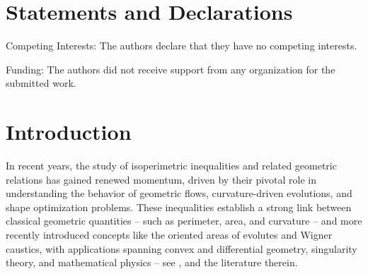 \documentclass{amsart}
\theoremstyle{definition}
\numberwithin{equation}{section}
\begin{document}
\maketitle

\section*{Statements and Declarations}
Competing Interests: The authors declare that they have no competing interests.

Funding: The authors did not receive support from any organization for the submitted work.

\section{Introduction}

\noindent In recent years, the study of isoperimetric inequalities and related geometric relations has gained renewed momentum, driven by their pivotal role in understanding the behavior of geometric flows, curvature-driven evolutions, and shape optimization problems. These inequalities establish a strong link between classical geometric quantities -- such as perimeter, area, and curvature -- and more recently introduced concepts like the oriented areas of evolutes and Wigner caustics, with applications spanning convex and differential geometry, singularity theory, and mathematical physics -- see \cite{CGR1, G6, G7, GS1, G4, G2, kwonglee, kwong, PanShu, Schmidt, YY,  ZD, Z2, Z3, ZCWMS}, and the literature therein.
\end{document}
